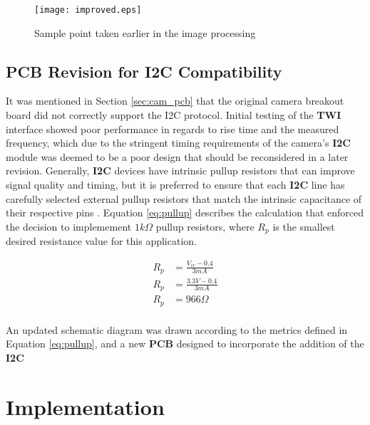 \documentclass[11pt, a4paper, oneside]{Thesis} %
\begin{document}
\begin{figure}[h]
  \begin{center}
    \texttt{[image: improved.eps]}
  \end{center}
  \caption{Sample point taken earlier in the image processing}
  \label{fig:improved}
\end{figure}

\section{PCB Revision for I2C Compatibility}\label{sec:i2c_redesign}
It was mentioned in Section \ref{sec:cam_pcb} that the original camera breakout board did not correctly support the I2C protocol. Initial testing of the \textbf{TWI} interface showed poor performance in regards to rise time and the measured frequency, which due to the stringent timing requirements of the camera's \textbf{I2C} module was deemed to be a poor design that should be reconsidered in a later revision. Generally, \textbf{I2C} devices have intrinsic pullup resistors that can improve signal quality and timing, but it is preferred to ensure that each \textbf{I2C} line has carefully selected external pullup resistors that match the intrinsic capacitance of their respective pins \cite{truchsess2010}. Equation \ref{eq:pullup} describes the calculation that enforced the decision to implemement $1k \Omega$ pullup resistors, where $R_p$ is the smallest desired resistance value for this application.

\begin{equation}\label{eq:pullup}
\begin{split}
  R_p & = \frac{V_{cc}-0.4}{3mA} \\
  R_p & = \frac{3.3V-0.4}{3mA} \\
  R_p & = 966\Omega \\
\end{split}
\end{equation}

An updated schematic diagram was drawn according to the metrics defined in Equation \ref{eq:pullup}, and a new \textbf{PCB} designed to incorporate the addition of the \textbf{I2C} 


\chapter{Implementation}
\label{chap:implementation} %
\end{document}
